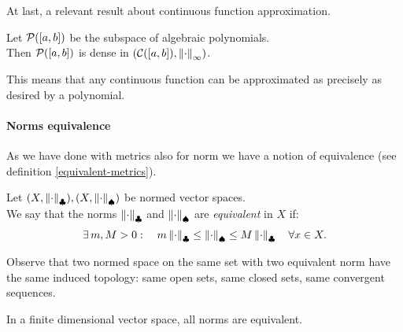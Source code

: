 At last, a relevant result about continuous function approximation.
\begin{theo}\label{theo-stone-weierstrass}
	Let $\mathcal P([a,b])$ be the subspace of algebraic polynomials. \\
	Then $\mathcal P([a,b])$ is dense in $(\mathcal C([a,b]),\left\lVert\cdot\right\rVert_\infty)$.
\end{theo}
This means that any continuous function can be approximated as precisely as desired by a polynomial.

\paragraph{Norms equivalence} As we have done with metrics also for norm we have a notion of equivalence (see definition \vref{equivalent-metrics}).

\begin{defn}
	Let $(X,\left\lVert\cdot\right\rVert_\clubsuit), (X,\left\lVert\cdot\right\rVert_\spadesuit)$ be normed vector spaces. \\
	We say that the norms $\left\lVert\cdot\right\rVert_\clubsuit$ and $\left\lVert\cdot\right\rVert_\spadesuit$ are \emph{equivalent} in $X$ if:
	$$
	\exists \, m,M >0 : \quad 
	m\left\lVert\cdot\right\rVert_\clubsuit 
	\leq \left\lVert\cdot\right\rVert_\spadesuit 
	\leq M\left\lVert\cdot\right\rVert_\clubsuit 
	\quad \forall x \in X
	.
	$$
\end{defn}

Observe that two normed space on the same set with two equivalent norm have the same induced topology: same open sets, same closed sets, same convergent sequences.

\begin{prop}
	In a finite dimensional vector space, all norms are equivalent.
\end{prop}

